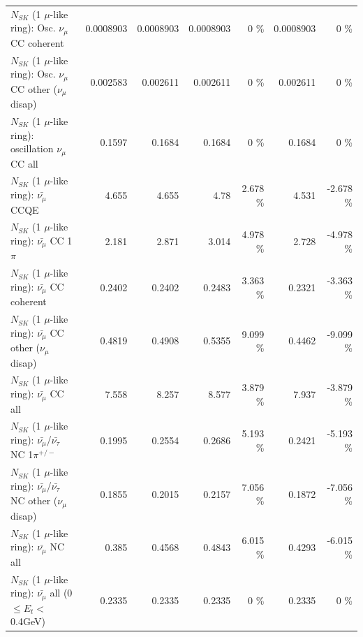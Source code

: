 \begin{table}
\begin{tabular}{| l | r | r | r  r | r  r |}
                        $N_{SK}$ (1 $\mu$-like ring): Osc. $\nu_\mu$ CC coherent &       0.0008903 &       0.0008903 &       0.0008903 &        0 \%  &       0.0008903 &        0 \%  \\ 
         $N_{SK}$ (1 $\mu$-like ring): Osc. $\nu_\mu$ CC other ($\nu_\mu$ disap) &        0.002583 &        0.002611 &        0.002611 &        0 \%  &        0.002611 &        0 \%  \\ 
                      $N_{SK}$ (1 $\mu$-like ring): oscillation $\nu_\mu$ CC all &          0.1597 &          0.1684 &          0.1684 &        0 \%  &          0.1684 &        0 \%  \\ 
\hline
\hline
                              $N_{SK}$ (1 $\mu$-like ring): $\bar{\nu_\mu}$ CCQE &           4.655 &           4.655 &            4.78 &    2.678 \%  &           4.531 &   -2.678 \%  \\ 
                         $N_{SK}$ (1 $\mu$-like ring): $\bar{\nu_\mu}$ CC 1$\pi$ &           2.181 &           2.871 &           3.014 &    4.978 \%  &           2.728 &   -4.978 \%  \\ 
                       $N_{SK}$ (1 $\mu$-like ring): $\bar{\nu_\mu}$ CC coherent &          0.2402 &          0.2402 &          0.2483 &    3.363 \%  &          0.2321 &   -3.363 \%  \\ 
        $N_{SK}$ (1 $\mu$-like ring): $\bar{\nu_\mu}$ CC other ($\nu_\mu$ disap) &          0.4819 &          0.4908 &          0.5355 &    9.099 \%  &          0.4462 &   -9.099 \%  \\ 
                          $N_{SK}$ (1 $\mu$-like ring): $\bar{\nu_{\mu}}$ CC all &           7.558 &           8.257 &           8.577 &    3.879 \%  &           7.937 &   -3.879 \%  \\ 
\hline
  $N_{SK}$ (1 $\mu$-like ring): $\bar{\nu_\mu}$/$\bar{\nu_\tau}$ NC 1$\pi^{+/-}$ &          0.1995 &          0.2554 &          0.2686 &    5.193 \%  &          0.2421 &   -5.193 \%  \\ 
$N_{SK}$ (1 $\mu$-like ring): $\bar{\nu_\mu}$/$\bar{\nu_\tau}$ NC other ($\nu_\mu$ disap) &          0.1855 &          0.2015 &          0.2157 &    7.056 \%  &          0.1872 &   -7.056 \%  \\ 
                          $N_{SK}$ (1 $\mu$-like ring): $\bar{\nu_{\mu}}$ NC all &           0.385 &          0.4568 &          0.4843 &    6.015 \%  &          0.4293 &   -6.015 \%  \\ 
\hline
   $N_{SK}$ (1 $\mu$-like ring): $\bar{\nu_{\mu}}$ all (0 $\leq E_{t} <$ 0.4GeV) &          0.2335 &          0.2335 &          0.2335 &        0 \%  &          0.2335 &        0 \%  \\ 

\end{tabular}
\end{table}
